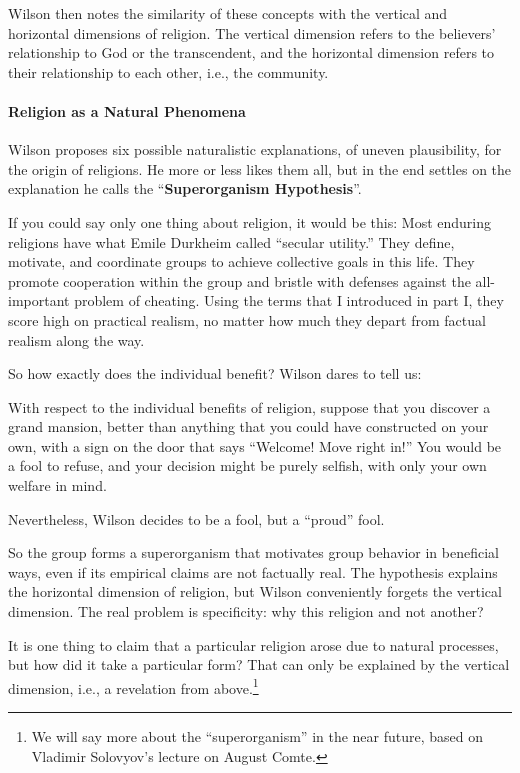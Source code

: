 Wilson then notes the similarity of these concepts with the vertical and horizontal dimensions of religion. The vertical dimension refers to the believers' relationship to God or the transcendent, and the horizontal dimension refers to their relationship to each other, i.e., the community.

\paragraph{Religion as a Natural Phenomena}


Wilson proposes six possible naturalistic explanations, of uneven plausibility, for the origin of religions. He more or less likes them all, but in the end settles on the explanation he calls the ``\textbf{Superorganism Hypothesis}''.

\begin{quotex}
If you could say only one thing about religion, it would be this: Most enduring religions have what Emile Durkheim called ``secular utility.'' They define, motivate, and coordinate groups to achieve collective goals in this life. They promote cooperation within the group and bristle with defenses against the all-important problem of cheating. Using the terms that I introduced in part I, they score high on practical realism, no matter how much they depart from factual realism along the way.
\end{quotex}


So how exactly does the individual benefit? Wilson dares to tell us:

\begin{quotex}
With respect to the individual benefits of religion, suppose that you discover a grand mansion, better than anything that you could have constructed on your own, with a sign on the door that says ``Welcome! Move right in!'' You would be a fool to refuse, and your decision might be purely selfish, with only your own welfare in mind.
\end{quotex}


Nevertheless, Wilson decides to be a fool, but a ``proud'' fool.

So the group forms a superorganism that motivates group behavior in beneficial ways, even if its empirical claims are not factually real. The hypothesis explains the horizontal dimension of religion, but Wilson conveniently forgets the vertical dimension. The real problem is specificity: why this religion and not another?

It is one thing to claim that a particular religion arose due to natural processes, but how did it take a particular form? That can only be explained by the vertical dimension, i.e., a revelation from above.\footnote{We will say more about the ``superorganism'' in the near future, based on Vladimir Solovyov's lecture on August Comte.}

